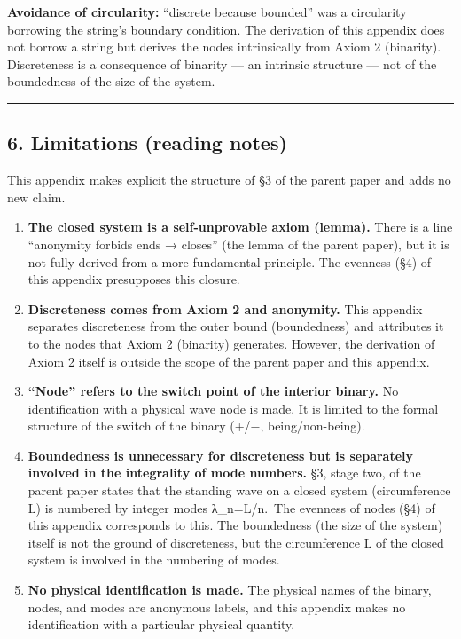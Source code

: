 \documentclass[11pt]{ltjsarticle}
\begin{document}
\textbf{Avoidance of circularity:} ``discrete because bounded'' was a
circularity borrowing the string's boundary condition. The derivation of
this appendix does not borrow a string but derives the nodes
intrinsically from Axiom 2 (binarity). Discreteness is a consequence of
binarity --- an intrinsic structure --- not of the boundedness of the
size of the system.

\begin{center}\rule{0.5\linewidth}{0.5pt}\end{center}

\subsection{6. Limitations (reading
notes)}\label{limitations-reading-notes}

This appendix makes explicit the structure of §3 of the parent paper and
adds no new claim.

\begin{enumerate}
\def\labelenumi{\arabic{enumi}.}
\item
  \textbf{The closed system is a self-unprovable axiom (lemma).} There
  is a line ``anonymity forbids ends → closes'' (the lemma of the parent
  paper), but it is not fully derived from a more fundamental principle.
  The evenness (§4) of this appendix presupposes this closure.
\item
  \textbf{Discreteness comes from Axiom 2 and anonymity.} This appendix
  separates discreteness from the outer bound (boundedness) and
  attributes it to the nodes that Axiom 2 (binarity) generates. However,
  the derivation of Axiom 2 itself is outside the scope of the parent
  paper and this appendix.
\item
  \textbf{``Node'' refers to the switch point of the interior binary.}
  No identification with a physical wave node is made. It is limited to
  the formal structure of the switch of the binary (+/−,
  being/non-being).
\item
  \textbf{Boundedness is unnecessary for discreteness but is separately
  involved in the integrality of mode numbers.} §3, stage two, of the
  parent paper states that the standing wave on a closed system
  (circumference L) is numbered by integer modes λ\_n=L/n.~The evenness
  of nodes (§4) of this appendix corresponds to this. The boundedness
  (the size of the system) itself is not the ground of discreteness, but
  the circumference L of the closed system is involved in the numbering
  of modes.
\item
  \textbf{No physical identification is made.} The physical names of the
  binary, nodes, and modes are anonymous labels, and this appendix makes
  no identification with a particular physical quantity.
\end{enumerate}
\end{document}
